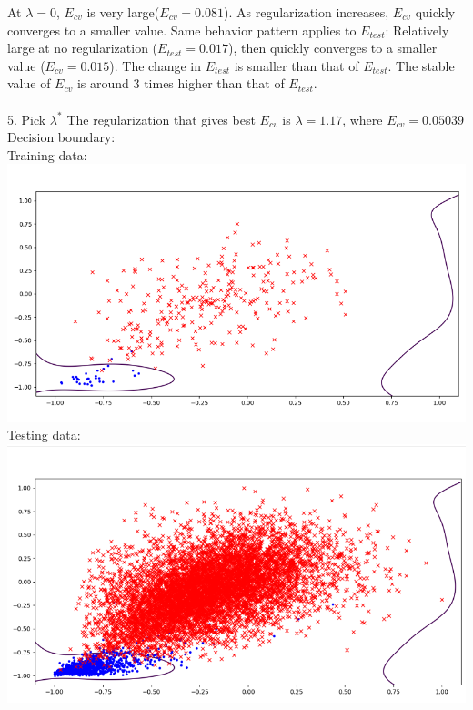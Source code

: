 \documentclass[12pt]{article}
\begin{document}
At $\lambda=0$, $E_{cv}$ is very large($E_{cv}=0.081$). As regularization increases, $E_{cv}$ quickly converges to a smaller value. Same behavior pattern applies to $E_{test}$: Relatively large at no regularization ($E_{test}=0.017$), then quickly converges to a smaller value ($E_{cv}=0.015$). The change in $E_{test}$ is smaller than that of $E_{test}$. The stable value of $E_{cv}$ is around 3 times higher than that of $E_{test}$.\\\\
5. Pick $\lambda^*$
The regularization that gives best $E_{cv}$ is $\lambda=1.17$, where $E_{cv}=0.05039$\\
Decision boundary:\\
Training data:\\
\includegraphics[scale=0.5]{images/lambda_star_train}\\
Testing data:\\
\includegraphics[scale=0.5]{images/lambda_star_test}\\
\end{document}
